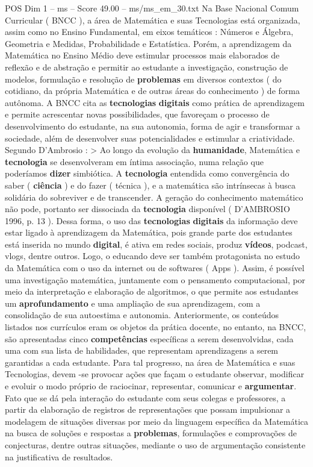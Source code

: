 \begin{textsample}{POS Dim 1 – ms – Score 49.00 – ms/ms\_em\_30.txt}
Na Base Nacional Comum Curricular ( BNCC ), a área de Matemática e suas Tecnologias está organizada, assim como no Ensino Fundamental, em eixos temáticos : Números e Álgebra, Geometria e Medidas, Probabilidade e Estatística.
Porém, a aprendizagem da Matemática no Ensino Médio deve estimular processos mais elaborados de reflexão e de abstração e permitir ao estudante a investigação, construção de modelos, formulação e resolução de \textbf{problemas} em diversos contextos ( do cotidiano, da própria Matemática e de outras áreas do conhecimento ) de forma autônoma.
A BNCC cita as \textbf{tecnologias} \textbf{digitais} como prática de aprendizagem e permite acrescentar novas possibilidades, que favoreçam o processo de desenvolvimento do estudante, na sua autonomia, forma de agir e transformar a sociedade, além de desenvolver suas potencialidades e estimular a criatividade.
Segundo D’Ambrosio : > Ao longo da evolução da \textbf{humanidade}, Matemática e \textbf{tecnologia} se desenvolveram em íntima associação, numa relação que poderíamos \textbf{dizer} simbiótica.
A \textbf{tecnologia} entendida como convergência do saber ( \textbf{ciência} ) e do fazer ( técnica ), e a matemática são intrínsecas à busca solidária do sobreviver e de transcender.
A geração do conhecimento matemático não pode, portanto ser dissociada da \textbf{tecnologia} disponível ( D’AMBROSIO 1996, p. 13 ).
Dessa forma, o uso das \textbf{tecnologias} \textbf{digitais} da informação deve estar ligado à aprendizagem da Matemática, pois grande parte dos estudantes está inserida no mundo \textbf{digital}, é ativa em redes sociais, produz \textbf{vídeos}, podcast, vlogs, dentre outros.
Logo, o educando deve ser também protagonista no estudo da Matemática com o uso da internet ou de softwares ( Apps ).
Assim, é possível uma investigação matemática, juntamente com o pensamento computacional, por meio da interpretação e elaboração de algoritmos, o que permite aos estudantes um \textbf{aprofundamento} e uma ampliação de sua aprendizagem, com a consolidação de sua autoestima e autonomia.
Anteriormente, os conteúdos listados nos currículos eram os objetos da prática docente, no entanto, na BNCC, são apresentadas cinco \textbf{competências} específicas a serem desenvolvidas, cada uma com sua lista de habilidades, que representam aprendizagens a serem garantidas a cada estudante.
Para tal progresso, na área de Matemática e suas Tecnologias, devem -se provocar ações que façam o estudante observar, modificar e evoluir o modo próprio de raciocinar, representar, comunicar e \textbf{argumentar}.
Fato que se dá pela interação do estudante com seus colegas e professores, a partir da elaboração de registros de representações que possam impulsionar a modelagem de situações diversas por meio da linguagem específica da Matemática na busca de soluções e respostas a \textbf{problemas}, formulações e comprovações de conjecturas, dentre outras situações, mediante o uso de argumentação consistente na justificativa de resultados.

\end{textsample}
